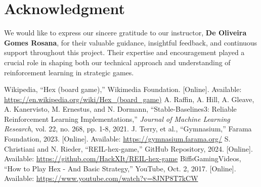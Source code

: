 \documentclass[conference]{IEEEtran}
\begin{document}
\section*{Acknowledgment}
We would like to express our sincere gratitude to our instructor, \textbf{De Oliveira Gomes Rosana}, for their valuable guidance, insightful feedback, and continuous support throughout this project. Their expertise and encouragement played a crucial role in shaping both our technical approach and understanding of reinforcement learning in strategic games.

\begin{thebibliography}{00}
 Wikipedia, ``Hex (board game),'' Wikimedia Foundation. [Online]. Available: \url{https://en.wikipedia.org/wiki/Hex_(board_game)}
 A. Raffin, A. Hill, A. Gleave, A. Kanervisto, M. Ernestus, and N. Dormann, ``Stable-Baselines3: Reliable Reinforcement Learning Implementations,'' \textit{Journal of Machine Learning Research}, vol. 22, no. 268, pp. 1-8, 2021.
 J. Terry, et al., ``Gymnasium,'' Farama Foundation, 2023. [Online]. Available: \url{https://gymnasium.farama.org/}
 S. Christiani and N. Rieder, ``REIL-hex-game,'' GitHub Repository, 2024. [Online]. Available: \url{https://github.com/HackXIt/REIL-hex-game}
 BiffsGamingVideos, ``How to Play Hex - And Basic Strategy,'' YouTube, Oct. 2, 2017. [Online]. Available: \url{https://www.youtube.com/watch?v=8JNP8T7kCW}
\end{thebibliography}
\end{document}
